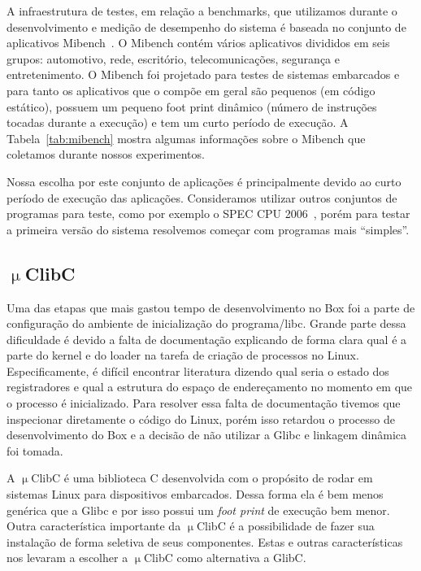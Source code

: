 \documentclass[11pt,twoside]{article}
\begin{document}
A infraestrutura de testes, em relação a benchmarks, que utilizamos durante o
desenvolvimento e medição de desempenho do sistema é baseada no conjunto de
aplicativos Mibench~\cite{mibench}. O Mibench contém vários aplicativos
divididos em seis grupos: automotivo, rede, escritório, telecomunicações,
segurança e entretenimento. O Mibench foi projetado para testes de sistemas
embarcados e para tanto os aplicativos que o compõe em geral são pequenos (em
código estático), possuem um pequeno foot print dinâmico (número de instruções
tocadas durante a execução) e tem um curto período de execução. A 
Tabela~\ref{tab:mibench} mostra algumas informações sobre o Mibench que 
coletamos durante nossos experimentos.

Nossa escolha por este conjunto de aplicações é principalmente devido ao curto
período de execução das aplicações. Consideramos utilizar outros conjuntos de
programas para teste, como por exemplo o SPEC CPU 2006~\cite{spec2006}, porém
para testar a primeira versão do sistema resolvemos começar com programas mais
``simples''.

\subsection{$\upmu$ClibC}

Uma das etapas que mais gastou tempo de desenvolvimento no Box foi a parte de
configuração do ambiente de inicialização do programa/libc.  Grande parte dessa
dificuldade é devido a falta de documentação explicando de forma clara qual é a
parte do kernel e do loader na tarefa de criação de processos no
Linux. Especificamente, é difícil encontrar literatura dizendo qual seria o
estado dos registradores e qual a estrutura do espaço de endereçamento no
momento em que o processo é inicializado. Para resolver essa falta de
documentação tivemos que inspecionar diretamente o código do Linux, porém isso
retardou o processo de desenvolvimento do Box e a decisão de não utilizar a
Glibc e linkagem dinâmica foi tomada.

A $\upmu$ClibC é uma biblioteca C desenvolvida com o propósito de rodar em
sistemas Linux para dispositivos embarcados. Dessa forma ela é bem menos
genérica que a Glibc e por isso possui um \emph{foot print} de execução bem
menor. Outra característica importante da $\upmu$ClibC é a possibilidade de
fazer sua instalação de forma seletiva de seus componentes. Estas e outras
características nos levaram a escolher a $\upmu$ClibC como alternativa a GlibC.
\end{document}
